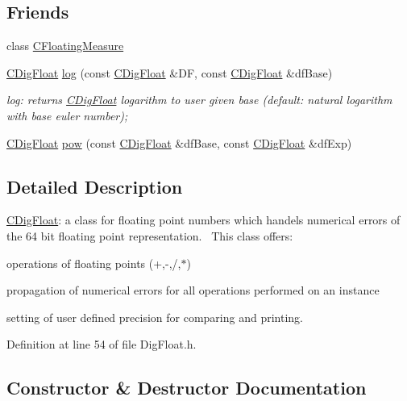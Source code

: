 \subsection*{Friends}
\begin{DoxyCompactItemize}
\item 
class \hyperlink{classCDigFloat_a7e23751869edf87edc0feeb80eda78d9}{C\+Floating\+Measure}
\item 
\hyperlink{classCDigFloat}{C\+Dig\+Float} \hyperlink{classCDigFloat_a25031604af1e6356848a9ac84c209903}{log} (const \hyperlink{classCDigFloat}{C\+Dig\+Float} \&DF, const \hyperlink{classCDigFloat}{C\+Dig\+Float} \&df\+Base)
\begin{DoxyCompactList}\small\item\em log\+: returns \hyperlink{classCDigFloat}{C\+Dig\+Float} logarithm to user given base (default\+: natural logarithm with base euler number); \end{DoxyCompactList}\item 
\hyperlink{classCDigFloat}{C\+Dig\+Float} \hyperlink{classCDigFloat_ac5877d13039d236858e1cb04351f0a86}{pow} (const \hyperlink{classCDigFloat}{C\+Dig\+Float} \&df\+Base, const \hyperlink{classCDigFloat}{C\+Dig\+Float} \&df\+Exp)
\end{DoxyCompactItemize}


\subsection{Detailed Description}
\hyperlink{classCDigFloat}{C\+Dig\+Float}\+: a class for floating point numbers which handels numerical errors of the 64 bit floating point representation.~\newline
 This class offers\+: 


\begin{DoxyItemize}
\item operations of floating points (+,-\/,/,$\ast$)
\item propagation of numerical errors for all operations performed on an instance
\item setting of user defined precision for comparing and printing. 
\end{DoxyItemize}

Definition at line 54 of file Dig\+Float.\+h.



\subsection{Constructor \& Destructor Documentation}
\mbox{\label{classCDigFloat_ac16694fac9b3b0350f5d02888638ae20}} 
